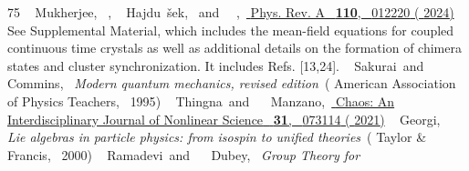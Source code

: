 \documentclass[pra,aps,twocolumn,superscriptaddress,notitlepage]{revtex4-1}
\begin{document}
\begin{thebibliography}{75}
		 { {~\bibnamefont
				{Mukherjee}},  {~},
			 {~\bibnamefont
				{Hajdu\ifmmode~\else \v{s}\fi{}ek}}, \ and\ 
			{~},\ }\href {\doibase
			10.1103/PhysRevA.110.012220} { {
				{Phys. Rev. A}\ }\textbf { {110}},\ 
			{012220} ( {2024})}%
		\BibitemOpen
		\href@noop {} {} {See Supplemental Material, which includes
			the mean-field equations for coupled continuous time crystals as well as
			additional details on the formation of chimera states and cluster
			synchronization. It includes Refs. [13,24].}%
		\BibitemOpen
		 { {\ \bibnamefont
				{Sakurai}}\ and\  {\ \bibnamefont
				{Commins}},\ }\href@noop {} {\emph { {Modern quantum
					mechanics, revised edition}}}\ ( {American Association
			of Physics Teachers},\  {1995})%
		\BibitemOpen
		 { {~\bibnamefont
				{Thingna}}\ and\  {~\bibnamefont
				{Manzano}},\ }\href {\doibase 10.1063/5.0045308} {
			{ {Chaos: An Interdisciplinary Journal of Nonlinear
					Science}\ }\textbf { {31}},\  {073114}
			( {2021})}%
		\BibitemOpen
		 { {~\bibnamefont
				{Georgi}},\ }\href@noop {} {\emph { {Lie algebras in particle
					physics: from isospin to unified theories}}}\ ( {Taylor
			\& Francis},\  {2000})%
		\BibitemOpen
		 { {~\bibnamefont
				{Ramadevi}}\ and\  {~\bibnamefont
				{Dubey}},\ }\href@noop {} {\emph { {Group Theory for
}}}
\end{thebibliography}
\end{document}
